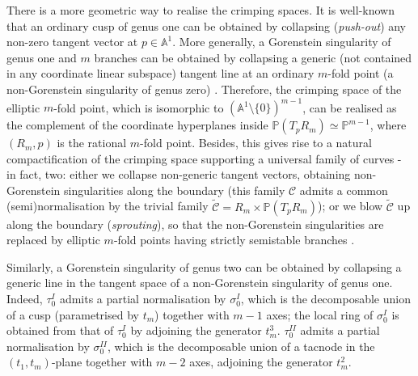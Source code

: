 \documentclass{compositio}
\newcommand{\PP}{\mathbb P}
\newcommand{\Aaff}{\mathbb A}
\theoremstyle{plain}
\theoremstyle{definition}
\theoremstyle{remark}
\begin{document}


There is a more geometric way to realise the crimping spaces. It is well-known that an ordinary cusp of genus one can be obtained by collapsing (\emph{push-out}) any non-zero tangent vector at $p\in\Aaff^1$. More generally, a Gorenstein singularity of genus one and $m$ branches can be obtained by collapsing a generic (not contained in any coordinate linear subspace) tangent line at an ordinary $m$-fold point (a non-Gorenstein singularity of genus zero) \cite[Lemma 2.2]{SMY1}. Therefore, the crimping space of the elliptic $m$-fold point, which is isomorphic to $(\Aaff^1\setminus\{0\})^{m-1}$, can be realised as the complement of the coordinate hyperplanes inside $\PP(T_pR_m)\simeq\PP^{m-1}$, where $(R_m,p)$ is the rational $m$-fold point. Besides, this gives rise to a natural compactification of the crimping space supporting a universal family of curves - in fact, two: either we collapse non-generic tangent vectors, obtaining non-Gorenstein singularities along the boundary (this family $\mathcal C$ admits a common (semi)normalisation by the trivial family $\widetilde{\mathcal C}=R_m\times \PP(T_pR_m)$); or we blow $\widetilde{\mathcal C}$ up along the boundary (\emph{sprouting}), so that the non-Gorenstein singularities are replaced by elliptic $m$-fold points having strictly semistable branches \cite[\S 2.2-3]{SMY2}.

Similarly, a Gorenstein singularity of genus two can be obtained by collapsing a generic line in the tangent space of a non-Gorenstein singularity of genus one. Indeed, $\tau_0^{I}$ admits a partial normalisation by $\sigma_0^{I}$, which is the decomposable union of a cusp (parametrised by $t_m$) together with $m-1$ axes; the local ring of $\sigma_0^{I}$ is obtained from that of $\tau_0^{I}$ by adjoining the generator $t_m^3$.  $\tau_0^{I\!I}$ admits a partial normalisation by $\sigma_0^{I\!I}$, which is the decomposable union of a tacnode in the $(t_1,t_m)$-plane together with $m-2$ axes, adjoining the generator $t_m^2$.
\end{document}
